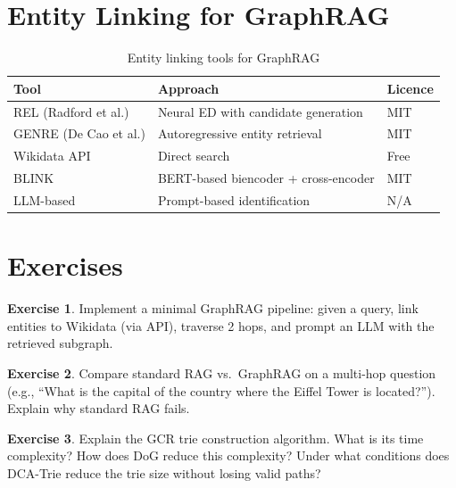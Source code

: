 \documentclass[11pt,a4paper,oneside,openany]{book}
\theoremstyle{definition}
\newtheorem{exercise}{Exercise}[chapter]
\theoremstyle{plain}
\theoremstyle{remark}
\begin{document}
\section{Entity Linking for GraphRAG}\label{sec:el-graphrag}

\begin{table}[h]
	\centering
	\caption{Entity linking tools for GraphRAG}
	\label{tab:el-tools}
	\begin{tabular}{lp{5cm}p{4cm}}
		\toprule
		Tool                  & Approach                             & Licence \\
		\midrule
		REL (Radford et al.)  & Neural ED with candidate generation  & MIT     \\
		GENRE (De Cao et al.) & Autoregressive entity retrieval      & MIT     \\
		Wikidata API          & Direct search                        & Free    \\
		BLINK                 & BERT-based biencoder + cross-encoder & MIT     \\
		LLM-based             & Prompt-based identification          & N/A     \\
		\bottomrule
	\end{tabular}
\end{table}

\section{Exercises}

\begin{exercise}
	Implement a minimal GraphRAG pipeline: given a query, link entities to Wikidata (via API), traverse 2 hops, and prompt an LLM with the retrieved subgraph.
\end{exercise}

\begin{exercise}
	Compare standard RAG vs.\ GraphRAG on a multi-hop question (e.g., ``What is the capital of the country where the Eiffel Tower is located?''). Explain why standard RAG fails.
\end{exercise}

\begin{exercise}
	Explain the GCR trie construction algorithm. What is its time complexity? How does DoG reduce this complexity? Under what conditions does DCA-Trie reduce the trie size without losing valid paths?
\end{exercise}
\end{document}
